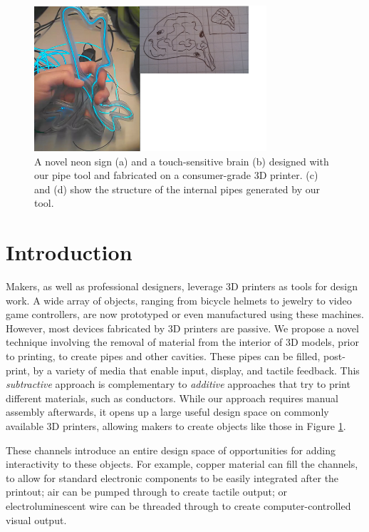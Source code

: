 \begin{figure}[h]
\centering
    \includegraphics[width=3.4in]{figures/placeholder/teaser.png}
\caption{A novel neon sign (a) and a touch-sensitive brain (b) designed with our pipe tool and fabricated on a consumer-grade 3D printer.  (c) and (d) show the structure of the internal pipes generated by our tool.}
\label{fig:teaser}
\end{figure}

\section{Introduction}

Makers, as well as professional designers, leverage 3D printers as tools for design work.  A wide array of objects, ranging from bicycle helmets to jewelry to video game controllers, are now prototyped or even manufactured using these machines.  However, most devices fabricated by 3D printers are passive.  We propose a novel technique involving the removal of material from the interior of 3D models, prior to printing, to create pipes and other cavities.  These pipes can be filled, post-print, by a variety of media that enable input, display, and tactile feedback.  This {\em subtractive} approach is complementary to {\em additive} approaches that try to print different materials, such as conductors. While our approach requires manual assembly afterwards, it opens up a large useful design space on commonly available 3D printers, allowing makers to create objects like those in Figure \ref{fig:teaser}.

These channels introduce an entire design space of opportunities for adding interactivity to these objects. For example, copper material can fill the channels, to allow for standard electronic components to be easily integrated after the printout; air can be pumped through to create tactile output; or electroluminescent wire can be threaded through to create computer-controlled visual output.


